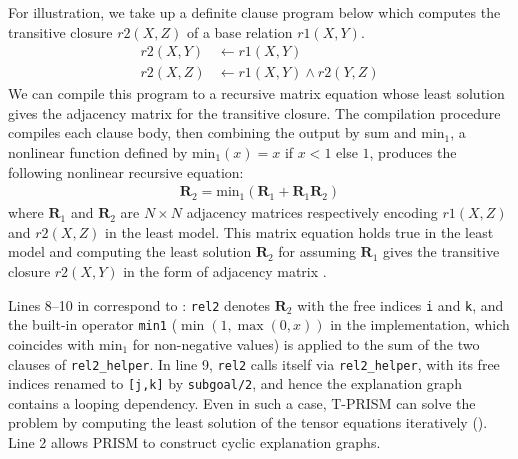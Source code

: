 \documentclass[a4paper]{report}
\newcommand{\mmat}[1]{\mathbf{#1}}
\newcommand{\minx}{\mbox{min}_1}
\begin{document}
For illustration,  we take  up a definite  clause program  below which
computes  the   transitive  closure  $r2(X,Z)$  of   a  base  relation
$r1(X,Y)$.
%
\begin{align}\nonumber
r2(X,Y) & \leftarrow r1(X,Y) \\
r2(X,Z) & \leftarrow r1(X,Y) \wedge r2(Y,Z)
\label{eq:trnsitive}
\end{align}
%
We can compile this program to a recursive matrix equation whose least
solution gives the  adjacency matrix for the  transitive closure.  The
compilation procedure  compiles each  clause body, then  combining the
output by sum and $\minx$, a nonlinear function defined by $\minx(x) =
x$ if  $x < 1$  else $1$,  produces the following  nonlinear recursive
equation:
%
\begin{eqnarray}
\mmat{R}_2 = \minx(\mmat{R}_1+\mmat{R}_1\mmat{R}_2)
\label{eq:tr}
\end{eqnarray}
%
where  $\mmat{R}_1$  and  $\mmat{R}_2$  are  $N  \times  N$  adjacency
matrices respectively  encoding $r1(X,Z)$  and $r2(X,Z)$ in  the least
model.   This  matrix equation  holds  true  in  the least  model  and
computing  the  least   solution  $\mmat{R}_2$  for  
assuming $\mmat{R}_1$  gives the  transitive closure $r2(X,Y)$  in the
form of adjacency matrix \cite{sato2017linear}.

Lines 8--10 in  correspond to :
{\tt rel2} denotes $\mmat{R}_2$ with the free indices {\tt i} and {\tt k},
and the built-in operator {\tt min1} ($\min(1,\max(0,x))$ in the
implementation, which coincides with $\minx$ for non-negative values)
is applied to the sum of the two clauses of {\tt rel2\_helper}.  In line 9,
{\tt rel2} calls itself via {\tt rel2\_helper}, with its free indices
renamed to {\tt [j,k]} by {\tt subgoal/2}, and hence the explanation graph
contains a looping dependency.  Even in such a case, T-PRISM can solve the
problem by computing the least solution of the tensor equations
iteratively ().  Line 2 allows PRISM to construct
cyclic explanation graphs.
\end{document}
